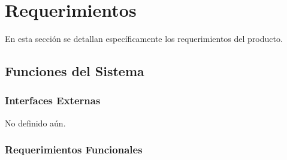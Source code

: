 \documentclass[10pt,a4paper,english,spanish]{article}
\begin{document}
\section{Requerimientos}
\label{section-req} 
En esta sección se detallan específicamente los requerimientos del producto. 

\subsection{Funciones del Sistema}

	\subsubsection{Interfaces Externas}
		 No definido aún.
		
	\subsubsection{Requerimientos Funcionales}
\end{document}
